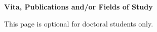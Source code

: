 
\centerline{\textbf{Vita, Publications and/or Fields of Study}}
\vspace*{4\baselineskip}
This page is optional for doctoral students only.